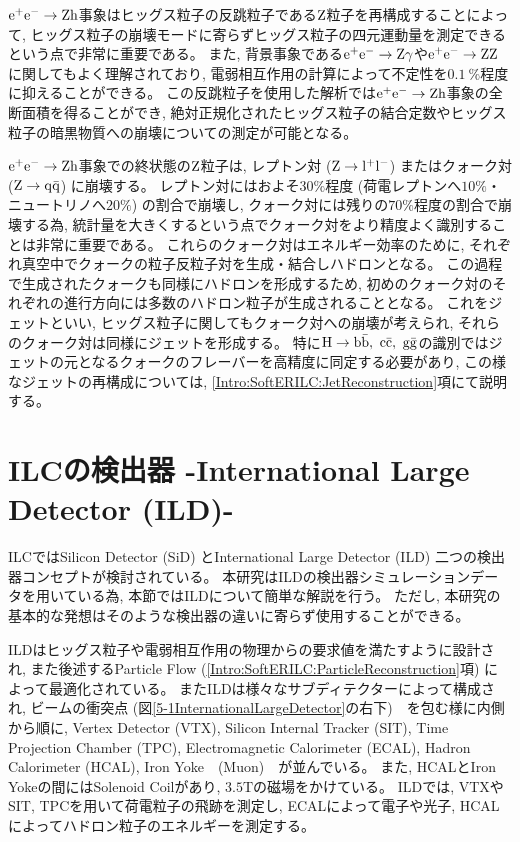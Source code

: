 $\rm e^+e^- \to Zh$事象はヒッグス粒子の反跳粒子である$\rm Z$粒子を再構成することによって, ヒッグス粒子の崩壊モードに寄らずヒッグス粒子の四元運動量を測定できるという点で非常に重要である。
また, 背景事象である$\rm e^+e^- \to Z\gamma$や$\rm e^+e^- \to ZZ$に関してもよく理解されており, 電弱相互作用の計算によって不定性を$0.1\ \%$程度に抑えることができる\cite{GlobalProject}。
この反跳粒子を使用した解析では$\rm e^+e^- \to Zh$事象の全断面積を得ることができ, 絶対正規化されたヒッグス粒子の結合定数やヒッグス粒子の暗黒物質への崩壊についての測定が可能となる。

$\rm e^+e^- \to Zh$事象での終状態の$\rm Z$粒子は, レプトン対 ($\rm Z \to l^+l^-$) またはクォーク対 ($\rm Z \to q\bar{q}$) に崩壊する。
レプトン対にはおよそ$30\%$程度 (荷電レプトンへ$10\%$・ニュートリノへ$20\%$) の割合で崩壊し, クォーク対には残りの$70\%$程度の割合で崩壊する為, 統計量を大きくするという点でクォーク対をより精度よく識別することは非常に重要である。
これらのクォーク対はエネルギー効率のために, それぞれ真空中でクォークの粒子反粒子対を生成・結合しハドロンとなる。
この過程で生成されたクォークも同様にハドロンを形成するため, 初めのクォーク対のそれぞれの進行方向には多数のハドロン粒子が生成されることとなる。
これをジェットといい, ヒッグス粒子に関してもクォーク対への崩壊が考えられ, それらのクォーク対は同様にジェットを形成する。
特に$\rm H \to b \bar{b},\ c \bar{c},\ g \bar{g}$の識別ではジェットの元となるクォークのフレーバーを高精度に同定する必要があり, この様なジェットの再構成については, \ref{Intro:SoftERILC:JetReconstruction}項にて説明する。


\section{ILCの検出器 -International Large Detector (ILD)-} \label{Intro:InternationalLargeDetector}

ILCではSilicon Detector (SiD) とInternational Large Detector (ILD) 二つの検出器コンセプトが検討されている。
本研究はILDの検出器シミュレーションデータを用いている為, 本節ではILDについて簡単な解説を行う。
ただし, 本研究の基本的な発想はそのような検出器の違いに寄らず使用することができる。

ILDはヒッグス粒子や電弱相互作用の物理からの要求値を満たすように設計され, また後述するParticle Flow (\ref{Intro:SoftERILC:ParticleReconstruction}項) によって最適化されている。
またILDは様々なサブディテクターによって構成され, ビームの衝突点 (図\ref{5-1InternationalLargeDetector}の右下)　を包む様に内側から順に, Vertex Detector (VTX), Silicon Internal Tracker (SIT), Time Projection Chamber (TPC), Electromagnetic Calorimeter (ECAL), Hadron Calorimeter (HCAL), Iron Yoke　(Muon)　が並んでいる。
また, HCALとIron Yokeの間にはSolenoid Coilがあり, $3.5 \mathrm{T}$の磁場をかけている。
ILDでは, VTXやSIT, TPCを用いて荷電粒子の飛跡を測定し, ECALによって電子や光子, HCALによってハドロン粒子のエネルギーを測定する。


